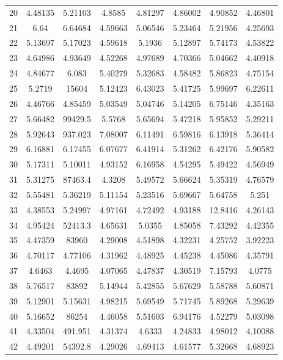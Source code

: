 \begin{center}
\begin{longtable}{cccccccc}
20 & 4.48135 & 5.21103 & 4.8585 & 4.81297 & 4.86002 & 4.90852 & 4.46801\\
21 & 6.64 & 6.64684 & 4.59663 & 5.06546 & 5.23464 & 5.21956 & 4.25693\\
22 & 5.13697 & 5.17023 & 4.59618 & 5.1936 & 5.12897 & 5.74173 & 4.53822\\
23 & 4.64986 & 4.93649 & 4.52268 & 4.97689 & 4.70366 & 5.04662 & 4.40918\\
24 & 4.84677 & 6.083 & 5.40279 & 5.32683 & 4.58482 & 5.86823 & 4.75154\\
25 & 5.2719 & 15604 & 5.12423 & 6.43023 & 5.41725 & 5.99697 & 6.22611\\
26 & 4.46766 & 4.85459 & 5.03549 & 5.04746 & 5.14205 & 6.75146 & 4.35163\\
27 & 5.66482 & 99429.5 & 5.5768 & 5.65694 & 5.47218 & 5.95852 & 5.29211\\
28 & 5.92643 & 937.023 & 7.08007 & 6.11491 & 6.59816 & 6.13918 & 5.36414\\
29 & 6.16881 & 6.17455 & 6.07677 & 6.41914 & 5.31262 & 6.42176 & 5.90582\\
30 & 5.17311 & 5.10011 & 4.93152 & 6.16958 & 4.54295 & 5.49422 & 4.56949\\
31 & 5.31275 & 87463.4 & 4.3208 & 5.49572 & 5.66624 & 5.35319 & 4.76579\\
32 & 5.55481 & 5.36219 & 5.11154 & 5.23516 & 5.69667 & 5.64758 & 5.251\\
33 & 4.38553 & 5.24997 & 4.97161 & 4.72492 & 4.93188 & 12.8416 & 4.26143\\
34 & 4.95424 & 52413.3 & 4.65631 & 5.0355 & 4.85058 & 7.43292 & 4.42355\\
35 & 4.47359 & 83960 & 4.29008 & 4.51898 & 4.32231 & 4.25752 & 3.92223\\
36 & 4.70117 & 4.77106 & 4.31962 & 4.48925 & 4.45238 & 4.45086 & 4.35791\\
37 & 4.6463 & 4.4695 & 4.07065 & 4.47837 & 4.30519 & 7.15793 & 4.0775\\
38 & 5.76517 & 83892 & 5.14944 & 5.42855 & 5.67629 & 5.58788 & 5.60871\\
39 & 5.12901 & 5.15631 & 4.98215 & 5.69549 & 5.71745 & 5.89268 & 5.29639\\
40 & 5.16652 & 86254 & 4.46058 & 5.51603 & 6.94176 & 4.52279 & 5.03098\\
41 & 4.33504 & 491.951 & 4.31374 & 4.6333 & 4.24833 & 4.98012 & 4.10088\\
42 & 4.49201 & 54392.8 & 4.29026 & 4.69413 & 4.61577 & 5.32668 & 4.68923\\

\end{longtable}
\end{center}
